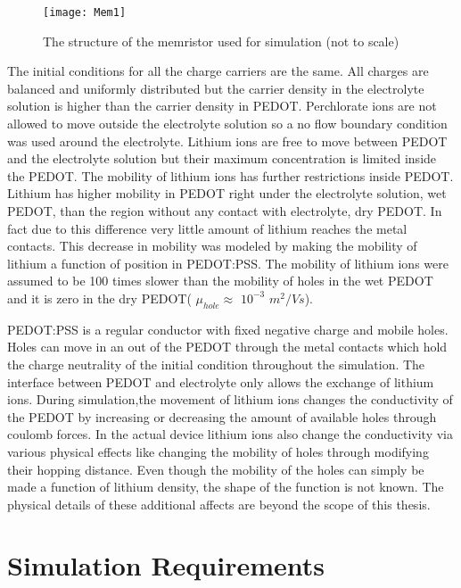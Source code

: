 \begin{doublespace}
\begin{figure}[!htp]
\centering
\texttt{[image: Mem1]}
\caption{The structure of the memristor used for simulation (not to scale)} 
\label{MemStc}
\end{figure}


The initial conditions for all the charge carriers are the same. All charges are balanced and uniformly distributed but the carrier density in the electrolyte solution is higher than the carrier density in PEDOT. Perchlorate ions are not allowed to move outside the electrolyte solution so a no flow boundary condition was used around the electrolyte. Lithium ions are free to move between PEDOT and the electrolyte solution but their maximum concentration is limited inside the PEDOT. The mobility of lithium ions has further restrictions inside PEDOT. Lithium has higher mobility in PEDOT right under the electrolyte solution, wet PEDOT, than the region without any contact with electrolyte, dry PEDOT. In fact due to this difference very little amount of lithium reaches the metal contacts. This decrease in mobility was modeled by making the mobility of lithium a function of position in PEDOT:PSS. The mobility of lithium ions were assumed to be 100 times slower than the mobility of holes in the wet PEDOT and it is zero in the dry PEDOT( $\mu_{hole} \approx$ $10^{-3}$ $m^2/Vs$). 

 


PEDOT:PSS is a regular conductor with fixed negative charge and mobile holes. Holes can move in an out of the PEDOT through the metal contacts which hold the charge neutrality of the initial condition throughout the simulation. The interface between PEDOT and electrolyte only allows the exchange of lithium ions. During simulation,the movement of lithium ions changes the conductivity of the PEDOT by increasing or decreasing the amount of available holes through coulomb forces. In the actual device lithium ions also change the conductivity via various physical effects like changing the mobility of holes through modifying their hopping distance. Even though the mobility of the holes can simply be made a function of lithium density, the shape of the function is not known. The physical details of these additional affects are beyond the scope of this thesis. 




\clearpage
\section{Simulation Requirements}


\end{doublespace}
